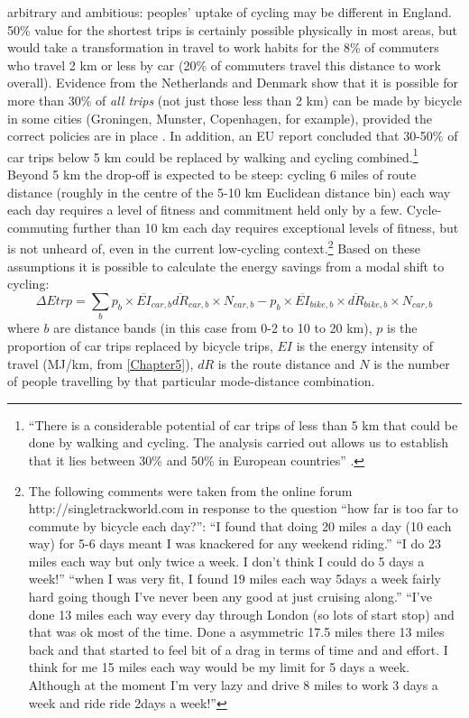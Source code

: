 arbitrary and ambitious: peoples' uptake of cycling may be different in England.
50\% value for the shortest trips is certainly possible physically in most
areas, but would
take a transformation in travel to work habits for the 8\% of commuters who
travel 2 km or less by car (20\% of commuters travel this distance to work
overall). Evidence from the Netherlands and Denmark show that it
is possible for more than 30\% of \emph{all trips} (not just those less than 2
km) can be made by bicycle in some cities (Groningen, Munster, Copenhagen,
for example), provided the correct policies are in place \citep{Rietveld2004,
Pucher2010}.
In addition, an EU report concluded that 30-50\% of car trips below
5 km could be replaced by walking and cycling
combined.\footnote{``There
is a considerable potential of car trips of less than 5 km that could be
done by walking and cycling. The analysis carried out allows us to establish
that it lies between 30\% and 50\% in European countries''
\citep[p.~60]{Gnavi1999walcying}.
}
Beyond 5 km the drop-off is expected to be steep: cycling 6 miles of route
distance (roughly in the centre of the 5-10 km Euclidean distance bin) each way
each day requires a level of fitness and commitment held only by a few.
Cycle-commuting further than 10 km each day requires exceptional levels of
fitness, but is not unheard of, even in the current low-cycling
context.\footnote{The following comments
were taken from the online forum http://singletrackworld.com in response to
the question ``how far is too far to commute by bicycle each day?'': ``I found
that doing 20 miles a day (10 each way) for 5-6 days meant I was knackered for
any weekend riding.'' ``I do 23 miles each way but only twice a week. I don't
think I could do 5 days a week!''  ``when I was very fit, I found 19 miles each
way 5days a week fairly hard going though I've never been any good at just
cruising along.'' ``I've done 13 miles each way every day through London (so
lots of start stop) and that was ok most of the time. Done a asymmetric 17.5
miles there 13 miles back and that started to feel bit of a drag in terms of
time and and effort. I think for me 15 miles each way would be my limit for 5
days a week.
Although at the moment I'm very lazy and drive 8 miles to work 3 days a week and
ride ride 2days a week!''
}
Based on these assumptions it is possible to calculate the energy savings from
a modal shift to cycling:
\begin{equation}
 \Delta Etrp = \sum_{b} p_b \times \overline{EI}_{car,b}
\overline{dR}_{car,b} \times N_{car,b} - p_b \times \overline{EI}_{bike,b}
\times \overline{dR}_{bike,b} \times N_{car,b}
\end{equation}
where $b$ are distance bands (in this case from 0-2 to 10 to 20 km), $p$ is
the proportion of car trips replaced by bicycle trips, $EI$ is the energy
intensity of travel (MJ/km, from \cref{Chapter5}), $dR$ is the route distance
and $N$ is the number of people travelling by that particular mode-distance
combination. 

